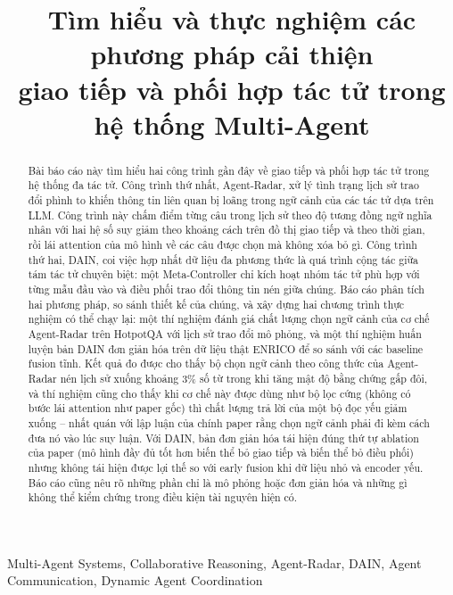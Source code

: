 \documentclass[conference]{IEEEtran}
\title{Tìm hiểu và thực nghiệm các phương pháp cải thiện\\ giao tiếp và phối hợp tác tử trong hệ thống Multi-Agent}
\author{
\IEEEauthorblockN{Họ và tên sinh viên}
\IEEEauthorblockA{Khoa/lớp -- Trường Đại học\\
Email}
\and
\IEEEauthorblockN{Hướng dẫn: Giảng viên hướng dẫn}
\IEEEauthorblockA{Bộ môn}
}
\begin{document}
\maketitle

\begin{abstract}
Bài báo cáo này tìm hiểu hai công trình gần đây về giao tiếp và phối hợp tác tử trong hệ thống đa tác tử. Công trình thứ nhất, Agent-Radar, xử lý tình trạng lịch sử trao đổi phình to khiến thông tin liên quan bị loãng trong ngữ cảnh của các tác tử dựa trên LLM. Công trình này chấm điểm từng câu trong lịch sử theo độ tương đồng ngữ nghĩa nhân với hai hệ số suy giảm theo khoảng cách trên đồ thị giao tiếp và theo thời gian, rồi lái attention của mô hình về các câu được chọn mà không xóa bỏ gì. Công trình thứ hai, DAIN, coi việc hợp nhất dữ liệu đa phương thức là quá trình cộng tác giữa tám tác tử chuyên biệt: một Meta-Controller chỉ kích hoạt nhóm tác tử phù hợp với từng mẫu đầu vào và điều phối trao đổi thông tin nén giữa chúng. Báo cáo phân tích hai phương pháp, so sánh thiết kế của chúng, và xây dựng hai chương trình thực nghiệm có thể chạy lại: một thí nghiệm đánh giá chất lượng chọn ngữ cảnh của cơ chế Agent-Radar trên HotpotQA với lịch sử trao đổi mô phỏng, và một thí nghiệm huấn luyện bản DAIN đơn giản hóa trên dữ liệu thật ENRICO để so sánh với các baseline fusion tĩnh. Kết quả đo được cho thấy bộ chọn ngữ cảnh theo công thức của Agent-Radar nén lịch sử xuống khoảng 3\% số từ trong khi tăng mật độ bằng chứng gấp đôi, và thí nghiệm cũng cho thấy khi cơ chế này được dùng như bộ lọc cứng (không có bước lái attention như paper gốc) thì chất lượng trả lời của một bộ đọc yếu giảm xuống -- nhất quán với lập luận của chính paper rằng chọn ngữ cảnh phải đi kèm cách đưa nó vào lúc suy luận. Với DAIN, bản đơn giản hóa tái hiện đúng thứ tự ablation của paper (mô hình đầy đủ tốt hơn biến thể bỏ giao tiếp và biến thể bỏ điều phối) nhưng không tái hiện được lợi thế so với early fusion khi dữ liệu nhỏ và encoder yếu. Báo cáo cũng nêu rõ những phần chỉ là mô phỏng hoặc đơn giản hóa và những gì không thể kiểm chứng trong điều kiện tài nguyên hiện có.
\end{abstract}

\begin{IEEEkeywords}
Multi-Agent Systems, Collaborative Reasoning, Agent-Radar, DAIN, Agent Communication, Dynamic Agent Coordination
\end{IEEEkeywords}












\end{document}
